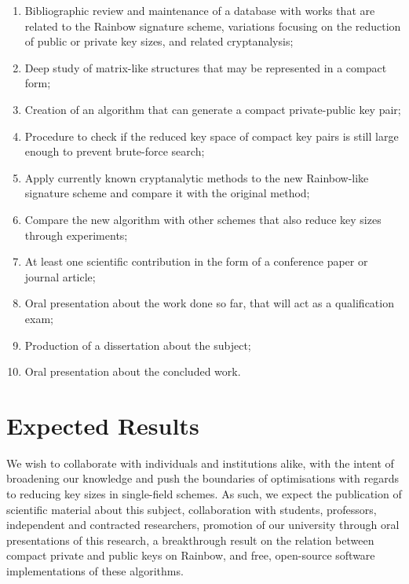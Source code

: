 \documentclass[10pt]{article}
\begin{document}
\begin{enumerate}[label=\alph*.]
    \item Bibliographic review and maintenance of a database with works that are related to the Rainbow signature scheme, variations focusing on the reduction of public or private key sizes, and related cryptanalysis;
    \item Deep study of matrix-like structures that may be represented in a compact form;
    \item Creation of an algorithm that can generate a compact private-public key pair;
    \item Procedure to check if the reduced key space of compact key pairs is still large enough to prevent brute-force search;
    \item Apply currently known cryptanalytic methods to the new Rainbow-like signature scheme and compare it with the original method;
    \item Compare the new algorithm with other schemes that also reduce key sizes through experiments;
    \item At least one scientific contribution in the form of a conference paper or journal article;
    \item Oral presentation about the work done so far, that will act as a qualification exam;
    \item Production of a dissertation about the subject;
    \item Oral presentation about the concluded work.
\end{enumerate}

\section{Expected Results}

We wish to collaborate with individuals and institutions alike, with the intent of broadening our knowledge and push the boundaries of optimisations with regards to reducing key sizes in single-field schemes. As such, we expect the publication of scientific material about this subject, collaboration with students, professors, independent and contracted researchers, promotion of our university through oral presentations of this research, a breakthrough result on the relation between compact private and public keys on Rainbow, and free, open-source software implementations of these algorithms.



\end{document}
